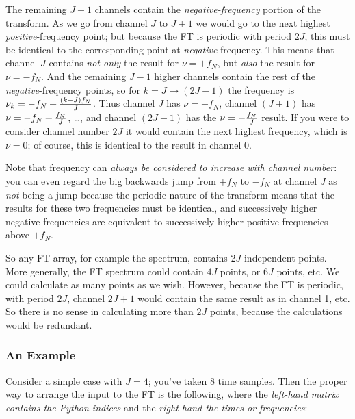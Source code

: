 \documentclass[11pt,preprint]{aastex}
\begin{document}
          The remaining $J-1$ channels contain the {\it
negative-frequency} portion of the transform.  As we go from channel $J$
to $J+1$ we would go to the next highest {\it positive}-frequency point;
but because the FT is periodic with period $2J$, this must be identical
to the corresponding point at {\it negative} frequency.  This means that
channel $J$ contains {\it not only} the result for $\nu = +f_N$, but {\it
also} the result for $\nu = -f_N$.  And the remaining $J-1$ higher
channels contain the rest of the {\it negative}-frequency points, so for
$k = J \rightarrow (2J-1)$ the frequency is $\nu _k = -f_N + {(k - J) f_N
\over J}$.  Thus channel $J$ has $\nu = -f_N$, channel $(J+1)$ has $\nu =
-f_N + {f_N \over J}$, \dots, and channel $(2J-1)$ has the $\nu = -{f_N
\over J}$ result.  If you were to consider channel number $2J$ it would
contain the next highest frequency, which is $\nu = 0$; of course, this
is identical to the result in channel 0. 

          Note that frequency can {\it always be considered to increase
with channel number}: you can even regard the big backwards jump from
$+f_N$ to $-f_N$ at channel $J$ as {\it not} being a jump because the
periodic nature of the transform means that the results for these two
frequencies must be identical, and successively higher negative
frequencies are equivalent to successively higher positive frequencies
above $+f_N$. 

          So any FT array, for example the spectrum, contains $2J$
independent points.  More generally, the FT spectrum could contain $4J$
points, or $6J$ points, etc.  We could calculate as many points as we
wish.  However, because the FT is periodic, with period $2J$, channel
$2J+1$ would contain the same result as in channel 1, etc.  So there is
no sense in calculating more than $2J$ points, because the calculations
would be redundant. 

\subsubsection{An Example}

          Consider a simple case with $J=4$; you've taken 8 time
samples.  Then the proper way to arrange the input to the FT is the
following, where the {\it left-hand matrix contains the Python indices} and
the {\it right hand the times or frequencies}:
\end{document}

